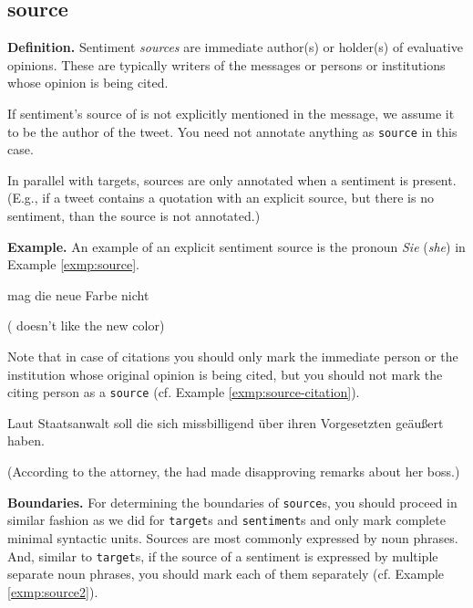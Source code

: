 \subsection{source}
\noindent\textbf{Definition.} Sentiment \emph{sources} are immediate author(s)
or holder(s) of evaluative opinions.  These are typically writers of the
messages or persons or institutions whose opinion is being cited.

If sentiment's source of is not explicitly mentioned in the message,
we assume it to be the author of the tweet. You need not annotate
anything as \texttt{source} in this case.

In parallel with targets, sources are only annotated when a sentiment
is present. (E.g., if a tweet contains a quotation with an explicit
source, but there is no sentiment, than the source is not annotated.)

\noindent\textbf{Example.} An example of an explicit sentiment source
is the pronoun \textit{Sie} (\textit{she}) in Example
\ref{exmp:source}.
\begin{example}
   mag die neue Farbe nicht

  ( doesn't like the new color)\label{exmp:source}
\end{example}

Note that in case of citations you should only mark the immediate
person or the institution whose original opinion is being cited, but
you should not mark the citing person as a \texttt{source}
(cf. Example \ref{exmp:source-citation}).
\begin{example}
  Laut Staatsanwalt soll die  sich missbilligend \"uber
  ihren Vorgesetzten ge\"au\ss{}ert haben.

  (According to the attorney, the  had made
  disapproving remarks about her boss.)\label{exmp:source-citation}
\end{example}

\noindent\textbf{Boundaries.} For determining the boundaries of
\texttt{source}s, you should proceed in similar fashion as we did for
\texttt{target}s and \texttt{sentiment}s and only mark complete
minimal syntactic units.  Sources are most commonly expressed by noun
phrases.  And, similar to \texttt{target}s, if the source of a
sentiment is expressed by multiple separate noun phrases, you should
mark each of them separately (cf. Example \ref{exmp:source2}).

